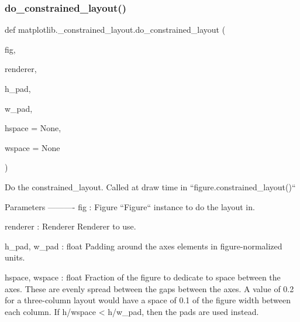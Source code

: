 \subsubsection{\texorpdfstring{do\+\_\+constrained\+\_\+layout()}{do\_constrained\_layout()}}
{\footnotesize\ttfamily def matplotlib.\+\_\+constrained\+\_\+layout.\+do\+\_\+constrained\+\_\+layout (\begin{DoxyParamCaption}\item[{}]{fig,  }\item[{}]{renderer,  }\item[{}]{h\+\_\+pad,  }\item[{}]{w\+\_\+pad,  }\item[{}]{hspace = {\ttfamily None},  }\item[{}]{wspace = {\ttfamily None} }\end{DoxyParamCaption})}

\begin{DoxyVerb}Do the constrained_layout.  Called at draw time in
 ``figure.constrained_layout()``

Parameters
----------
fig : Figure
    ``Figure`` instance to do the layout in.

renderer : Renderer
    Renderer to use.

h_pad, w_pad : float
  Padding around the axes elements in figure-normalized units.

hspace, wspace : float
   Fraction of the figure to dedicate to space between the
   axes.  These are evenly spread between the gaps between the axes.
   A value of 0.2 for a three-column layout would have a space
   of 0.1 of the figure width between each column.
   If h/wspace < h/w_pad, then the pads are used instead.
\end{DoxyVerb}
 